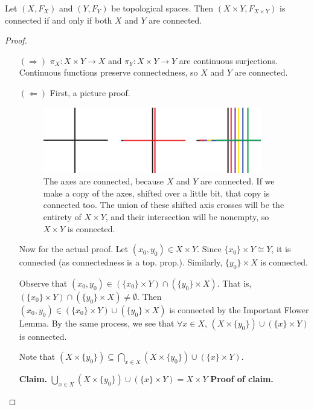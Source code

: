 \newpage
\begin{theorem}
	Let $(X, F_X)$ and $(Y, F_Y)$ be topological spaces. Then $(X\times Y, F_{X\times Y})$ is connected if and only if both $X$ and $Y$ are connected. 
\end{theorem}
\begin{proof}
	\begin{itemize}
		\item[$(\Rightarrow)$] $\pi_X: X\times Y \longrightarrow X$ and $\pi_Y: X\times Y \longrightarrow Y$ are continuous surjections. Continuous functions preserve connectedness, so $X$ and $Y$ are connected. 
		\item[$(\Leftarrow)$] First, a picture proof. 
		\begin{figure}[ht!] \centering 
			\includegraphics[width=0.9\textwidth]{images/connectedness/XxYconnected_comic}
			\caption{The axes are connected, because $X$ and $Y$ are connected. If we make a copy of the axes, shifted over a little bit, that copy is connected too. The union of these shifted axis crosses will be the entirety of $X\times Y$, and their intersection will be nonempty, so $X\times Y$ is connected.} 
		\end{figure}
		
		Now for the actual proof. Let $(x_0, y_0) \in X\times Y.$ Since $\{x_0\}\times Y \cong Y$, it is connected (as connectedness is a top. prop.). Similarly, $\{y_0\} \times X$ is connected.
		
		Observe that $(x_0, y_0) \in (\{x_0\}\times Y) \cap (\{y_0\} \times X)$. That is, $(\{x_0\}\times Y) \cap (\{y_0\} \times X) \neq \emptyset$. Then $(x_0, y_0) \in (\{x_0\}\times Y) \cup (\{y_0\} \times X)$ is connected by the Important Flower Lemma. By the same process, we see that $\forall x\in X$, $(X\times \{y_0\}) \cup (\{x\} \times Y)$ is connected.
		
		Note that $(X\times \{y_0\}) \subseteq \displaystyle{\bigcap_{x \in X}(X\times \{y_0\}) \cup (\{x\} \times Y)}$.
		
		\textbf{Claim.} $\displaystyle{\bigcup_{x \in X}(X\times \{y_0\}) \cup (\{x\} \times Y)} = X\times Y$ \textbf{Proof of claim.}
		

\end{itemize}
\end{proof}
